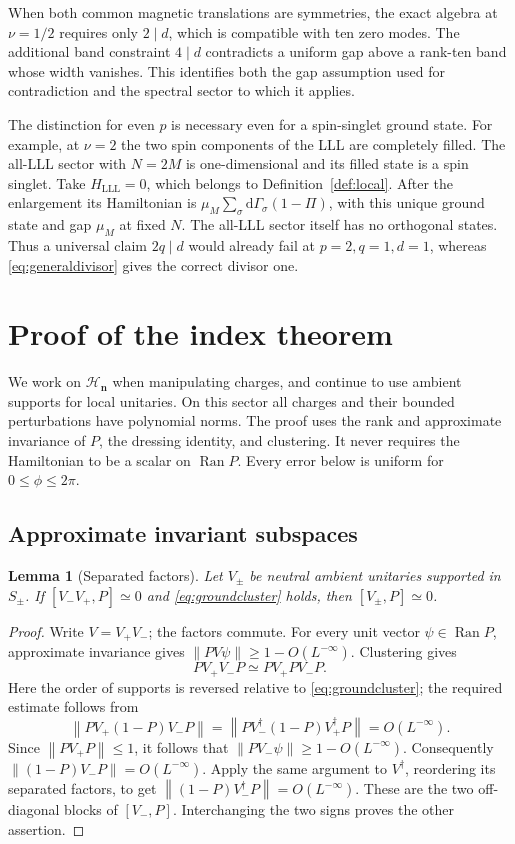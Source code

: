 \documentclass[11pt]{article}
\newtheorem{lemma}[theorem]{Lemma}
\theoremstyle{definition}
\theoremstyle{remark}
\newcommand{\Ran}{\operatorname{Ran}}
\newcommand{\dG}{\mathrm d\Gamma}
\newcommand{\HH}{\mathcal H}
\newcommand{\epsL}{O(L^{-\infty})}
\newcommand{\eqL}{\simeq}
\newcommand{\norm}[1]{\left\lVert#1\right\rVert}
\begin{document}
When both common magnetic translations are symmetries, the exact
algebra at \(\nu=1/2\) requires only \(2\mid d\), which is
compatible with ten zero modes.  The additional band constraint
\(4\mid d\) contradicts a uniform gap above a rank-ten band
whose width vanishes.  This identifies both the gap assumption
used for contradiction and the spectral sector to which it applies.

The distinction for even \(p\) is necessary even for a
spin-singlet ground state.  For example, at \(\nu=2\) the
two spin components of the LLL are completely filled.  The
all-LLL sector with \(N=2M\) is one-dimensional and its filled
state is a spin singlet.  Take \(H_{\mathrm{LLL}}=0\), which
belongs to Definition~\ref{def:local}.  After the enlargement its Hamiltonian
is \(\mu_M\sum_\sigma\dG_\sigma(1-\Pi)\), with this unique
ground state and gap \(\mu_M\) at fixed \(N\).  The all-LLL
sector itself has no orthogonal states.  Thus a universal
claim \(2q\mid d\) would already fail at \(p=2,q=1,d=1\),
whereas \eqref{eq:generaldivisor} gives the correct divisor one.


\section{Proof of the index theorem}\label{sec:proof}

We work on \(\HH_{\bm n}\) when manipulating charges, and continue
to use ambient supports for local unitaries.  On this sector all
charges and their bounded perturbations have polynomial norms.
The proof uses the rank and approximate invariance of \(P\),
the dressing identity, and clustering.  It never requires the
Hamiltonian to be a scalar on \(\Ran P\).
Every error below is uniform for \(0\le\phi\le2\pi\).

\subsection{Approximate invariant subspaces}

\begin{lemma}[Separated factors]\label{lem:factors}
Let \(V_\pm\) be neutral ambient unitaries supported in \(S_\pm\).
If \([V_-V_+,P]\eqL0\) and \eqref{eq:groundcluster} holds, then
\([V_\pm,P]\eqL0\).
\end{lemma}
\begin{proof}
Write \(V=V_+V_-\); the factors commute.  For every unit vector
\(\psi\in\Ran P\), approximate invariance gives
\(\norm{PV\psi}\ge1-\epsL\).  Clustering gives
\[
 PV_+V_-P\eqL PV_+PV_-P.
\]
Here the order of supports is reversed relative to
\eqref{eq:groundcluster}; the required estimate follows from
\[
 \norm{PV_+(1-P)V_-P}
 =\norm{PV_-^\dagger(1-P)V_+^\dagger P}=O(L^{-\infty}).
\]
Since \(\norm{PV_+P}\le1\), it follows that
\(\norm{PV_-\psi}\ge1-\epsL\).
Consequently \(\norm{(1-P)V_-P}=\epsL\).
Apply the same argument to \(V^\dagger\), reordering its
separated factors, to get
\(\norm{(1-P)V_-^\dagger P}=\epsL\).
These are the two off-diagonal blocks of \([V_-,P]\).
Interchanging the two signs proves the other assertion.
\end{proof}
\end{document}
